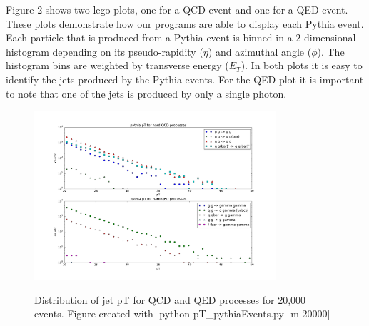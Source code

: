 \documentclass[11pt]{article}
\begin{document}
Figure 2 shows two lego plots, one for a QCD event and one for a QED event. These plots demonstrate how our programs are able to display each Pythia event. Each particle that is produced from a Pythia event is binned in a 2 dimensional histogram depending on its pseudo-rapidity ($\eta$) and azimuthal angle ($\phi$). The histogram bins are weighted by transverse energy ($E_T$). In both plots it is easy to identify the jets produced by the Pythia events. For the QED plot it is important to note that one of the jets is produced by only a single photon. 

\begin{figure}[h]
\begin{center}
\includegraphics[width=0.8\textwidth]{pT_pythiaEvents.pdf}
\label{fig_label}
\caption{Distribution of jet pT for QCD and QED processes for 20,000 events.  Figure created with [python pT\_pythiaEvents.py -m 20000]}
\end{center}
\end{figure}
\end{document}
